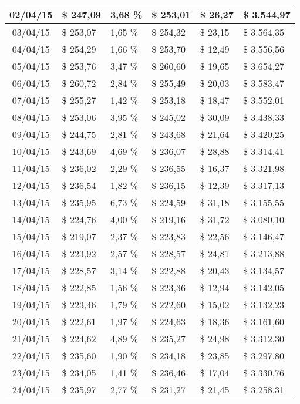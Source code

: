 \begin{small}
\begin{longtable}{|c|l|l|l|l|l|}
02/04/15 & \$ 247,09 & 3,68 \% & \$ 253,01 & \$ 26,27 & \$ 3.544,97 \\ \hline
03/04/15 & \$ 253,07 & 1,65 \% & \$ 254,32 & \$ 23,15 & \$ 3.564,35 \\ \hline
04/04/15 & \$ 254,29 & 1,66 \% & \$ 253,70 & \$ 12,49 & \$ 3.556,56 \\ \hline
05/04/15 & \$ 253,76 & 3,47 \% & \$ 260,60 & \$ 19,65 & \$ 3.654,27 \\ \hline
06/04/15 & \$ 260,72 & 2,84 \% & \$ 255,49 & \$ 20,03 & \$ 3.583,47 \\ \hline
07/04/15 & \$ 255,27 & 1,42 \% & \$ 253,18 & \$ 18,47 & \$ 3.552,01 \\ \hline
08/04/15 & \$ 253,06 & 3,95 \% & \$ 245,02 & \$ 30,09 & \$ 3.438,33 \\ \hline
09/04/15 & \$ 244,75 & 2,81 \% & \$ 243,68 & \$ 21,64 & \$ 3.420,25 \\ \hline
10/04/15 & \$ 243,69 & 4,69 \% & \$ 236,07 & \$ 28,88 & \$ 3.314,41 \\ \hline
11/04/15 & \$ 236,02 & 2,29 \% & \$ 236,55 & \$ 16,37 & \$ 3.321,98 \\ \hline
12/04/15 & \$ 236,54 & 1,82 \% & \$ 236,15 & \$ 12,39 & \$ 3.317,13 \\ \hline
13/04/15 & \$ 235,95 & 6,73 \% & \$ 224,59 & \$ 31,18 & \$ 3.155,55 \\ \hline
14/04/15 & \$ 224,76 & 4,00 \% & \$ 219,16 & \$ 31,72 & \$ 3.080,10 \\ \hline
15/04/15 & \$ 219,07 & 2,37 \% & \$ 223,83 & \$ 22,56 & \$ 3.146,47 \\ \hline
16/04/15 & \$ 223,92 & 2,57 \% & \$ 228,57 & \$ 24,81 & \$ 3.213,88 \\ \hline
17/04/15 & \$ 228,57 & 3,14 \% & \$ 222,88 & \$ 20,43 & \$ 3.134,57 \\ \hline
18/04/15 & \$ 222,85 & 1,56 \% & \$ 223,36 & \$ 12,94 & \$ 3.142,05 \\ \hline
19/04/15 & \$ 223,46 & 1,79 \% & \$ 222,60 & \$ 15,02 & \$ 3.132,23 \\ \hline
20/04/15 & \$ 222,61 & 1,97 \% & \$ 224,63 & \$ 18,36 & \$ 3.161,60 \\ \hline
21/04/15 & \$ 224,62 & 4,89 \% & \$ 235,27 & \$ 24,98 & \$ 3.312,30 \\ \hline
22/04/15 & \$ 235,60 & 1,90 \% & \$ 234,18 & \$ 23,85 & \$ 3.297,80 \\ \hline
23/04/15 & \$ 234,05 & 1,41 \% & \$ 236,46 & \$ 17,04 & \$ 3.330,76 \\ \hline
24/04/15 & \$ 235,97 & 2,77 \% & \$ 231,27 & \$ 21,45 & \$ 3.258,31 \\ \hline

\end{longtable}
\end{small}
